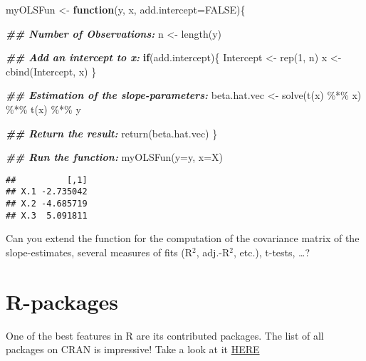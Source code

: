 \documentclass[
]{book}
\newenvironment{Shaded}{\begin{snugshade}}{\end{snugshade}}
\newcommand{\AttributeTok}[1]{\textcolor[rgb]{0.77,0.63,0.00}{#1}}
\newcommand{\ConstantTok}[1]{\textcolor[rgb]{0.00,0.00,0.00}{#1}}
\newcommand{\ControlFlowTok}[1]{\textcolor[rgb]{0.13,0.29,0.53}{\textbf{#1}}}
\newcommand{\DecValTok}[1]{\textcolor[rgb]{0.00,0.00,0.81}{#1}}
\newcommand{\DocumentationTok}[1]{\textcolor[rgb]{0.56,0.35,0.01}{\textbf{\textit{#1}}}}
\newcommand{\FunctionTok}[1]{\textcolor[rgb]{0.00,0.00,0.00}{#1}}
\newcommand{\NormalTok}[1]{#1}
\newcommand{\OtherTok}[1]{\textcolor[rgb]{0.56,0.35,0.01}{#1}}
\newcommand{\SpecialCharTok}[1]{\textcolor[rgb]{0.00,0.00,0.00}{#1}}
\begin{document}
\begin{Shaded}
\begin{Highlighting}[]
\NormalTok{myOLSFun }\OtherTok{\textless{}{-}} \ControlFlowTok{function}\NormalTok{(y, x, }\AttributeTok{add.intercept=}\ConstantTok{FALSE}\NormalTok{)\{}
  
  \DocumentationTok{\#\# Number of Observations:}
\NormalTok{  n         }\OtherTok{\textless{}{-}} \FunctionTok{length}\NormalTok{(y)}
  
  \DocumentationTok{\#\# Add an intercept to x:}
  \ControlFlowTok{if}\NormalTok{(add.intercept)\{}
\NormalTok{    Intercept }\OtherTok{\textless{}{-}} \FunctionTok{rep}\NormalTok{(}\DecValTok{1}\NormalTok{, n)}
\NormalTok{    x         }\OtherTok{\textless{}{-}} \FunctionTok{cbind}\NormalTok{(Intercept, x)}
\NormalTok{  \}}
  
  \DocumentationTok{\#\# Estimation of the slope{-}parameters:}
\NormalTok{  beta.hat.vec }\OtherTok{\textless{}{-}} \FunctionTok{solve}\NormalTok{(}\FunctionTok{t}\NormalTok{(x) }\SpecialCharTok{\%*\%}\NormalTok{ x) }\SpecialCharTok{\%*\%} \FunctionTok{t}\NormalTok{(x) }\SpecialCharTok{\%*\%}\NormalTok{ y}
  
  \DocumentationTok{\#\# Return the result:}
  \FunctionTok{return}\NormalTok{(beta.hat.vec)}
\NormalTok{\}}

\DocumentationTok{\#\# Run the function:}
\FunctionTok{myOLSFun}\NormalTok{(}\AttributeTok{y=}\NormalTok{y, }\AttributeTok{x=}\NormalTok{X)}
\end{Highlighting}
\end{Shaded}

\begin{verbatim}
##          [,1]
## X.1 -2.735042
## X.2 -4.685719
## X.3  5.091811
\end{verbatim}

\hfill\break

Can you extend the function for the computation of the covariance matrix of the slope-estimates, several measures of fits (R\(^2\), adj.-R\(^2\), etc.), t-tests, \ldots?

\hypertarget{r-packages}{%
\section{R-packages}\label{r-packages}}

One of the best features in R are its contributed packages. The list of all packages on CRAN is impressive! Take a look at it \href{https://cran.r-project.org/web/packages/available_packages_by_name.html}{HERE}
\end{document}
